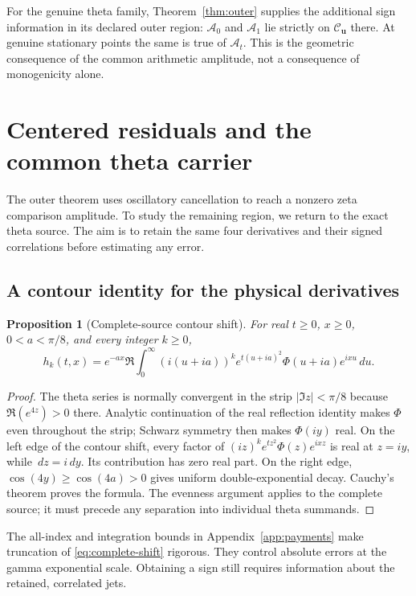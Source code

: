 \documentclass[11pt]{article}
\numberwithin{equation}{section}
\newtheorem{proposition}[theorem]{Proposition}
\theoremstyle{definition}
\theoremstyle{remark}
\newcommand{\dd}{\,d}
\begin{document}
For the genuine theta family, Theorem~\ref{thm:outer} supplies the
additional sign information in its declared outer region:
$\mathcal A_0$ and $\mathcal A_1$ lie strictly on
$\mathcal C_{\mathbf u}$ there. At genuine stationary points the same
is true of $\mathcal A_t$. This is the geometric consequence of the
common arithmetic amplitude, not a consequence of monogenicity alone.



\section{Centered residuals and the common theta carrier}\label{sec:residuals}

The outer theorem uses oscillatory cancellation to reach a nonzero zeta
comparison amplitude. To study the remaining region, we return to the
exact theta source.
The aim is to retain the same four derivatives and their signed
correlations before estimating any error.

\subsection{A contour identity for the physical derivatives}
\begin{proposition}[Complete-source contour shift]\label{prop:complete-shift}
For real $t\ge0$, $x\ge0$, $0<a<\pi/8$, and every integer $k\ge0$,
\begin{equation}
 h_k(t,x)=e^{-ax}\Re\int_0^\infty
 (i(u+ia))^k e^{t(u+ia)^2}\Phi(u+ia)e^{ixu}\dd u.
 \label{eq:complete-shift}
\end{equation}
\end{proposition}
\begin{proof}
The theta series is normally convergent in the strip
$|\Im z|<\pi/8$ because $\Re(e^{4z})>0$ there. Analytic continuation
of the real reflection identity makes $\Phi$ even throughout the
strip; Schwarz symmetry then makes $\Phi(iy)$ real. On the left edge
of the contour shift, every factor of
$(iz)^ke^{tz^2}\Phi(z)e^{ixz}$ is real at $z=iy$, while $\dd z=i\dd y$.
Its contribution has zero real part. On the right edge,
$\cos(4y)\ge\cos(4a)>0$ gives uniform double-exponential decay.
Cauchy's theorem proves the formula. The evenness argument applies
to the complete source; it must precede any separation into individual
theta summands.
\end{proof}

The all-index and integration bounds in Appendix~\ref{app:payments}
make truncation of \eqref{eq:complete-shift} rigorous. They control
absolute errors at the gamma exponential scale. Obtaining a sign still
requires information about the retained, correlated jets.
\end{document}
